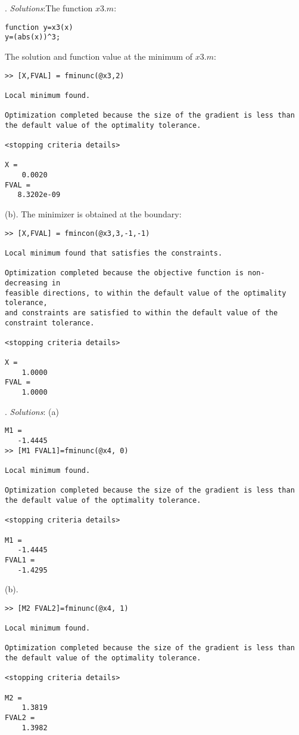 \documentclass[11pt]{article}
\begin{document}
. \textit{Solutions}:The function $x3.m$:

\begin{lstlisting}
function y=x3(x)
y=(abs(x))^3;
\end{lstlisting}

The solution and function value at the minimum of $x3.m$:

\begin{lstlisting}
>> [X,FVAL] = fminunc(@x3,2)

Local minimum found.

Optimization completed because the size of the gradient is less than
the default value of the optimality tolerance.

<stopping criteria details>

X =
    0.0020
FVAL =
   8.3202e-09
\end{lstlisting}

(b). The minimizer is obtained at the boundary:

\begin{lstlisting}
>> [X,FVAL] = fmincon(@x3,3,-1,-1)

Local minimum found that satisfies the constraints.

Optimization completed because the objective function is non-decreasing in 
feasible directions, to within the default value of the optimality tolerance,
and constraints are satisfied to within the default value of the constraint tolerance.

<stopping criteria details>

X =
    1.0000
FVAL =
    1.0000
\end{lstlisting}

. \textit{Solutions}: (a) \begin{lstlisting}
M1 =
   -1.4445
>> [M1 FVAL1]=fminunc(@x4, 0)

Local minimum found.

Optimization completed because the size of the gradient is less than
the default value of the optimality tolerance.

<stopping criteria details>

M1 =
   -1.4445
FVAL1 =
   -1.4295
\end{lstlisting}

(b). \begin{lstlisting}
>> [M2 FVAL2]=fminunc(@x4, 1)

Local minimum found.

Optimization completed because the size of the gradient is less than
the default value of the optimality tolerance.

<stopping criteria details>

M2 =
    1.3819
FVAL2 =
    1.3982
\end{lstlisting}
\end{document}
